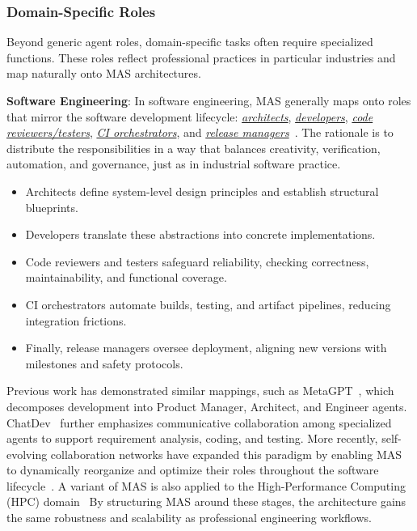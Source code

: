 \subsubsection{Domain-Specific Roles}
Beyond generic agent roles, domain-specific tasks often require specialized functions. 
These roles reflect professional practices in particular industries and map naturally onto MAS architectures.

\textbf{Software Engineering}: 
In software engineering, MAS generally maps onto roles that mirror the software development lifecycle: \underline{\emph{architects}}, \underline{\emph{developers}}, \underline{\emph{code reviewers/testers}}, \underline{\emph{CI orchestrators}}, and \underline{\emph{release managers}}~\cite{hong2024metagpt,ChatDev}. 
The rationale is to distribute the responsibilities in a way that balances creativity, verification, automation, and governance, just as in industrial software practice.
\begin{itemize}
    \item Architects define system-level design principles and establish structural blueprints. 
    \item Developers translate these abstractions into concrete implementations. 
    \item Code reviewers and testers safeguard reliability, checking correctness, maintainability, and functional coverage. 
    \item CI orchestrators automate builds, testing, and artifact pipelines, reducing integration frictions. 
    \item Finally, release managers oversee deployment, aligning new versions with milestones and safety protocols.
\end{itemize}

Previous work has demonstrated similar mappings, such as MetaGPT~\cite{hong2024metagpt}, which decomposes development into Product Manager, Architect, and Engineer agents. ChatDev~\cite{ChatDev} further emphasizes communicative collaboration among specialized agents to support requirement analysis, coding, and testing. More recently, self-evolving collaboration networks have expanded this paradigm by enabling MAS to dynamically reorganize and optimize their roles throughout the software lifecycle~\cite{hu2024self}. A variant of MAS is also applied to the High-Performance Computing (HPC) domain~\cite{pauloski2025empowering}
By structuring MAS around these stages, the architecture gains the same robustness and scalability as professional engineering workflows.

